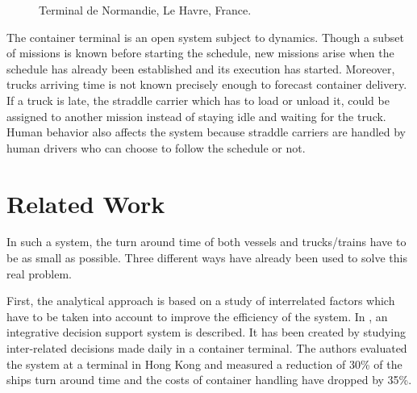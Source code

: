 \documentclass[journal]{IEEEtran}
\let\MYoriglatexcaption\caption
\renewcommand{\caption}[2][\relax]{\MYoriglatexcaption[#2]{#2}}
\begin{document}
\begin{figure}[h]
\caption[Terminal de Normandie, Le Havre, France]{Terminal de Normandie, Le
Havre, France\protect \footnotemark.}
\label{terminalDeNormandie}
\end{figure}

The container terminal is an open system subject to dynamics. Though a
subset of missions is known before starting the schedule, new missions arise when the schedule has already been established and its execution has started. Moreover, trucks
arriving time is not known precisely enough to forecast container delivery. If a truck is late, the straddle carrier which has to load or unload it, could be assigned to another mission instead of staying idle
and waiting for the truck. Human behavior also affects the system because straddle carriers are handled by human drivers who can choose to follow the schedule or not.


\section{Related Work}
In such a system, the turn around time of both vessels and trucks/trains have to
be as small as possible. Three different ways have already been used to solve
this real problem.

 First, the analytical approach is based on a study of interrelated factors
which have to be taken into account to improve the efficiency of the system. In \cite{murty2005}, an integrative decision support system is described. It has been created by studying inter-related decisions made daily in a container terminal. The authors evaluated the system at a terminal in Hong Kong and measured a reduction of 30\% of the ships turn around time and the costs of container handling have dropped by 35\%.
\end{document}
